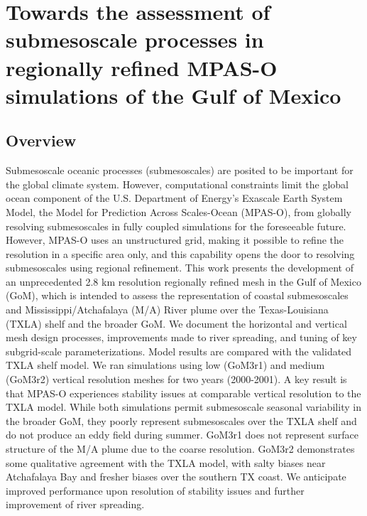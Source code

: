 


\chapter{Towards the assessment of submesoscale processes in regionally refined MPAS-O simulations of the Gulf of Mexico}

\section{Overview}
Submesoscale oceanic processes (submesoscales) are posited to be important for the global climate system. However, computational constraints limit the global ocean component of the U.S. Department of Energy's Exascale Earth System Model, the Model for Prediction Across Scales-Ocean (MPAS-O), from globally resolving submesoscales in fully coupled simulations for the foreseeable future. However, MPAS-O uses an unstructured grid, making it possible to refine the resolution in a specific area only, and this capability opens the door to resolving submesoscales using regional refinement. This work presents the development of an unprecedented 2.8 km resolution regionally refined mesh in the Gulf of Mexico (GoM), which is intended to assess the representation of coastal submesoscales and Mississippi/Atchafalaya (M/A) River plume over the Texas-Louisiana (TXLA) shelf and the broader GoM. We document the horizontal and vertical mesh design processes, improvements made to river spreading, and tuning of key subgrid-scale parameterizations. Model results are compared with the validated TXLA shelf model. We ran simulations using low (GoM3r1) and medium (GoM3r2) vertical resolution meshes for two years (2000-2001). A key result is that MPAS-O experiences stability issues at comparable vertical resolution to the TXLA model. While both simulations permit submesoscale seasonal variability in the broader GoM, they poorly represent submesoscales over the TXLA shelf and do not produce an eddy field during summer. GoM3r1 does not represent surface structure of the M/A plume due to the coarse resolution. GoM3r2 demonstrates some qualitative agreement with the TXLA model, with salty biases near Atchafalaya Bay and fresher biases over the southern TX coast. We anticipate improved performance upon resolution of stability issues and further improvement of river spreading.

